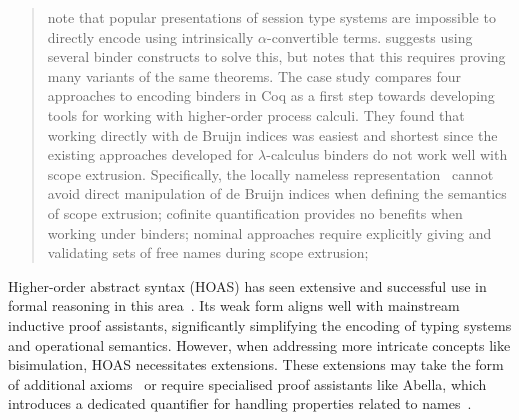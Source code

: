 \documentclass[runningheads]{llncs}
\begin{document}
\begin{quotation}
\cite{Castro-Perez2021,Castro2020} note that popular presentations of
session type systems are impossible to directly encode using
intrinsically \(\alpha\)-convertible terms.  \cite{Castro2020}
suggests using several binder constructs to solve this, but notes that
this requires proving many variants of the same theorems.
The case study \cite{AmbalLS21} compares four approaches to encoding
binders in Coq as a first step towards developing tools for working
with higher-order process calculi.  They found that working directly
with de Bruijn indices was easiest and shortest since the existing
approaches developed for $\lambda$-calculus binders do not work well
with scope extrusion.  Specifically, the locally nameless
representation~\cite{Chargueraud2012} cannot avoid direct manipulation
of de Bruijn indices when defining the semantics of scope extrusion;
cofinite quantification provides no benefits when working under
binders; nominal approaches require explicitly giving
and validating sets of free names during scope extrusion;
\end{quotation}


Higher-order abstract syntax (HOAS) has seen extensive and successful
use in formal reasoning in this area~\cite{Despeyroux2000,Honsell2001,Tiu2010}. Its
weak form aligns well with mainstream inductive proof assistants,
significantly simplifying the encoding of typing systems and operational
semantics. However, when addressing more intricate concepts like
bisimulation, HOAS necessitates extensions. These extensions may take
the form of additional axioms~\cite{Honsell2001} or require specialised proof assistants
like Abella, which introduces a dedicated quantifier for handling
properties related to names~\cite{GacekMN11}.

\end{document}
